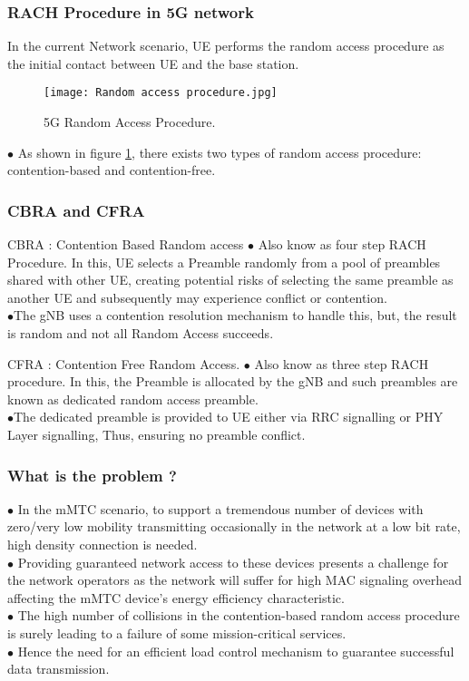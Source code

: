 \documentclass{beamer}
\begin{document}
\begin{frame}
\frametitle{RACH Procedure in 5G network}

 In the current Network scenario, UE performs the random access procedure as the initial contact between UE and the base station.\\
\begin{figure}[h]
\centering
\texttt{[image: Random access procedure.jpg]}
\caption{5G Random Access Procedure.}
\label{fig:Figure 1}
\end{figure}
$\bullet$ As shown in figure \ref{fig:Figure 1}, there exists two types of random access procedure:
contention-based and contention-free. \\

\end{frame}


\begin{frame}
\frametitle{CBRA and CFRA}
\begin{block}{CBRA : Contention Based Random access}
$\bullet$ Also know as four step RACH Procedure. In this, UE selects a Preamble randomly from a pool of preambles shared with other UE, creating potential risks of selecting the same preamble as another UE and subsequently may experience conflict or contention.\\
$\bullet$The gNB uses a contention resolution mechanism to handle this, but, the result is random and not all Random Access succeeds.
\end{block}
\begin{block}{CFRA : Contention Free Random Access.}
$\bullet$ Also know as three step RACH procedure. In this, the Preamble is allocated by the gNB and such preambles are known as dedicated random access preamble. \\
$\bullet$The dedicated preamble is provided to UE either via RRC signalling or PHY Layer signalling, Thus, ensuring no preamble conflict.
\end{block}

\end{frame}



\begin{frame}
\frametitle{What is the problem ?}

$\bullet$ In the mMTC scenario,  to support a tremendous number of devices with zero/very low mobility transmitting occasionally in the network at a low bit rate, high density connection is needed.
\\
$\bullet$ Providing guaranteed network access to these devices presents a challenge for the network operators as the network will suffer for high MAC signaling overhead affecting the mMTC device’s energy efficiency characteristic.\\
$\bullet$ The high number of collisions in the contention-based random access procedure is surely leading to a failure of some mission-critical services.\\
$\bullet$ Hence the need for an efficient load control mechanism to
guarantee successful data transmission.

\end{frame}
\end{document}
